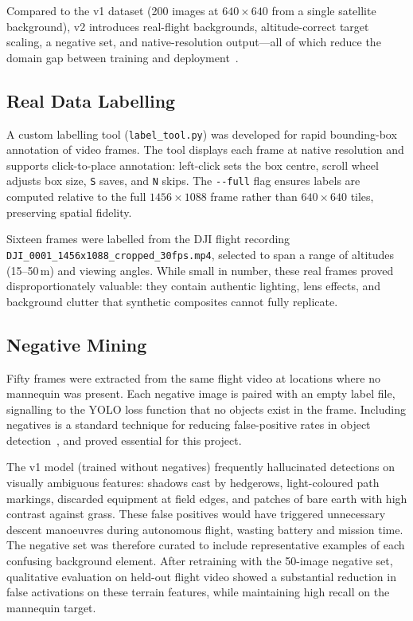 Compared to the v1 dataset (200 images at $640\times640$ from a single satellite background), v2 introduces real-flight backgrounds, altitude-correct target scaling, a negative set, and native-resolution output---all of which reduce the domain gap between training and deployment~\cite{synthdata}.

\subsection{Real Data Labelling}\label{sec:training:labelling}

A custom labelling tool (\texttt{label\_tool.py}) was developed for rapid bounding-box annotation of video frames. The tool displays each frame at native resolution and supports click-to-place annotation: left-click sets the box centre, scroll wheel adjusts box size, \texttt{S} saves, and \texttt{N} skips. The \texttt{-{}-full} flag ensures labels are computed relative to the full $1456\times1088$ frame rather than $640\times640$ tiles, preserving spatial fidelity.

Sixteen frames were labelled from the DJI flight recording \texttt{DJI\_0001\_1456x1088\_cropped\_30fps.mp4}, selected to span a range of altitudes (15--50\,m) and viewing angles. While small in number, these real frames proved disproportionately valuable: they contain authentic lighting, lens effects, and background clutter that synthetic composites cannot fully replicate.

\subsection{Negative Mining}\label{sec:training:negatives}

Fifty frames were extracted from the same flight video at locations where no mannequin was present. Each negative image is paired with an empty label file, signalling to the YOLO loss function that no objects exist in the frame. Including negatives is a standard technique for reducing false-positive rates in object detection~\cite{shrivastava2016training}, and proved essential for this project.

The v1 model (trained without negatives) frequently hallucinated detections on visually ambiguous features: shadows cast by hedgerows, light-coloured path markings, discarded equipment at field edges, and patches of bare earth with high contrast against grass. These false positives would have triggered unnecessary descent manoeuvres during autonomous flight, wasting battery and mission time. The negative set was therefore curated to include representative examples of each confusing background element. After retraining with the 50-image negative set, qualitative evaluation on held-out flight video showed a substantial reduction in false activations on these terrain features, while maintaining high recall on the mannequin target.

